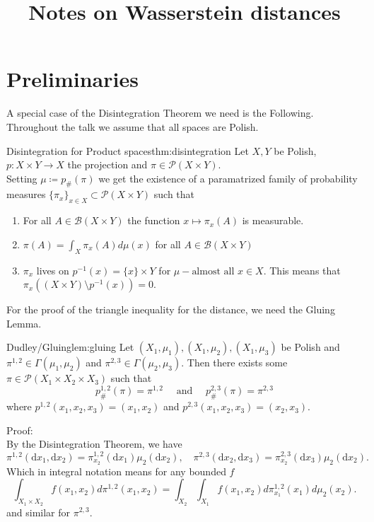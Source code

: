 \documentclass[15pt]{article}
\title{Notes on Wasserstein distances}
\author{ }
\date{}
\makeatletter
\newcommand{\mathleft}{\@fleqntrue\@mathmargin10pt}
\makeatother
\begin{document}
\maketitle

\newlength\breite
\setlength\breite{\linewidth-4pt}
\setlength\fboxsep{0pt}
\setlength\fboxrule{0.25pt}
\setlength{\abovedisplayskip}{3mm} %
\setlength{\belowdisplayskip}{3mm} %
\setlength\itemsep{0pt}
\setlength\parindent{0pt}


\mathleft

\section*{Preliminaries}

A special case of the Disintegration Theorem we need is the Following. 
Throughout the talk we assume that all spaces are Polish. 
\begin{theorem}{Disintegration for Product spaces}{thm:disintegration}
Let $X,Y$ be Polish, $p : X \times Y \rightarrow X$ the projection and $\pi \in \mathcal{P}(X \times Y)$. \\ 
Setting $\mu \coloneqq p_{\#}(\pi)$ we get the existence of a paramatrized family of probability measures $\{\pi_x\}_{x \in X} \subset \mathcal{P}(X \times Y)$ such that
\begin{enumerate}
\item For all $A \in \mathcal{B}(X \times Y)$ the function $x \mapsto \pi_x(A)$ is measurable.
\item $\pi(A) = \int_X \pi_x(A) d\mu(x)$ for all $A \in \mathcal{B}(X \times Y)$
\item $\pi_x$ lives on $p^{-1}(x) = \{x\} \times Y$ for $\mu-\text{almost all } x \in X.$ This means that $\pi_x((X \times Y) \setminus p^{-1}(x)) = 0.$
\end{enumerate} 
\end{theorem}

For the proof of the triangle inequality for the distance, we need the Gluing Lemma. 
\begin{lemma}{Dudley/Gluing}{lem:gluing}
Let $(X_1,\mu_1), (X_1,\mu_2),(X_1,\mu_3)$ be Polish and $\pi^{1,2} \in \Gamma(\mu_1,\mu_2)$ and $\pi^{2,3} \in \Gamma(\mu_2,\mu_3)$. 
Then there exists some $\pi \in \mathcal{P}(X_1 \times X_2 \times X_3)$ such that $$p_{\#}^{1,2}(\pi) = \pi^{1,2} \quad \text{ and } \quad p_{\#}^{2,3}(\pi) = \pi^{2,3}$$ where $p^{1,2}(x_1,x_2,x_3) = (x_1,x_2)$ and $p^{2,3}(x_1,x_2,x_3) = (x_2,x_3).$ 
\end{lemma}
Proof: 
\vspace{0.3cm} \\
By the Disintegration Theorem, we have $$\pi^{1,2}(\mathrm{d}x_1,\mathrm{d}x_2)=\pi_{x_2}^{1,2}(\mathrm{d}x_1)\mu_2(\mathrm{d}x_2),\quad\pi^{2,3}(\mathrm{d}x_2,\mathrm{d}x_3)=\pi_{x_2}^{2,3}(\mathrm{d}x_3)\mu_2(\mathrm{d}x_2).$$ 
Which in integral notation means for any bounded $f$ $$\int_{X_1 \times X_2} f(x_1,x_2) d\pi^{1,2}(x_1,x_2) = \int_{X_2} \int_{X_1} f(x_1,x_2) d\pi_{x_1}^{1,2}(x_1) d\mu_2(x_2).$$ and similar for $\pi^{2,3}$.
\end{document}
